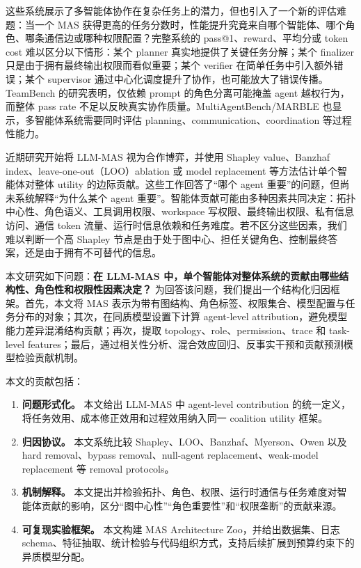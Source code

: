 \documentclass[UTF8,a4paper,11pt]{ctexart}
\begin{document}
这些系统展示了多智能体协作在复杂任务上的潜力，但也引入了一个新的评估难题：当一个 MAS 获得更高的任务分数时，性能提升究竟来自哪个智能体、哪个角色、哪条通信边或哪种权限配置？完整系统的 pass@1、reward、平均分或 token cost 难以区分以下情形：某个 planner 真实地提供了关键任务分解；某个 finalizer 只是由于拥有最终输出权限而看似重要；某个 verifier 在简单任务中引入额外错误；某个 supervisor 通过中心化调度提升了协作，也可能放大了错误传播。TeamBench 的研究表明，仅依赖 prompt 的角色分离可能掩盖 agent 越权行为，而整体 pass rate 不足以反映真实协作质量\cite{kim2026teambench}。MultiAgentBench/MARBLE 也显示，多智能体系统需要同时评估 planning、communication、coordination 等过程性能力\cite{zhu2025multiagentbench}。

近期研究开始将 LLM-MAS 视为合作博弈，并使用 Shapley value、Banzhaf index、leave-one-out（LOO）ablation 或 model replacement 等方法估计单个智能体对整体 utility 的边际贡献\cite{lu2026attribution,lu2026agents}。这些工作回答了“哪个 agent 重要”的问题，但尚未系统解释“为什么某个 agent 重要”。智能体贡献可能由多种因素共同决定：拓扑中心性、角色语义、工具调用权限、workspace 写权限、最终输出权限、私有信息访问、通信 token 流量、运行时信息依赖和任务难度。若不区分这些因素，我们难以判断一个高 Shapley 节点是由于处于图中心、担任关键角色、控制最终答案，还是由于拥有不可替代的信息。

本文研究如下问题：\textbf{在 LLM-MAS 中，单个智能体对整体系统的贡献由哪些结构性、角色性和权限性因素决定？} 为回答该问题，我们提出一个结构化归因框架。首先，本文将 MAS 表示为带有图结构、角色标签、权限集合、模型配置与任务分布的对象；其次，在同质模型设置下计算 agent-level attribution，避免模型能力差异混淆结构贡献；再次，提取 topology、role、permission、trace 和 task-level features；最后，通过相关性分析、混合效应回归、反事实干预和贡献预测模型检验贡献机制。

本文的贡献包括：
\begin{enumerate}
  \item \textbf{问题形式化。} 本文给出 LLM-MAS 中 agent-level contribution 的统一定义，将任务效用、成本修正效用和过程效用纳入同一 coalition utility 框架。
  \item \textbf{归因协议。} 本文系统比较 Shapley、LOO、Banzhaf、Myerson、Owen 以及 hard removal、bypass removal、null-agent replacement、weak-model replacement 等 removal protocols。
  \item \textbf{机制解释。} 本文提出并检验拓扑、角色、权限、运行时通信与任务难度对智能体贡献的影响，区分“图中心性”“角色重要性”和“权限垄断”的贡献来源。
  \item \textbf{可复现实验框架。} 本文构建 MAS Architecture Zoo，并给出数据集、日志 schema、特征抽取、统计检验与代码组织方式，支持后续扩展到预算约束下的异质模型分配。
\end{enumerate}
\end{document}

